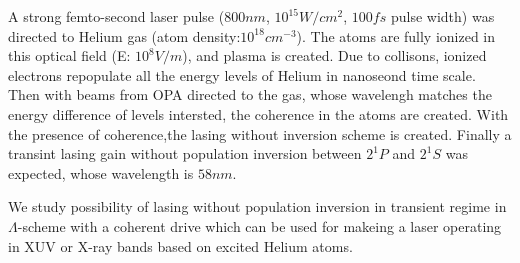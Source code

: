 A strong femto-second laser pulse ($800nm$, $10^{15} W/cm^2$, $100fs$ pulse width) was directed to Helium gas (atom density:$10^{18}cm^{-3}$). The atoms are fully ionized in this optical field (E: $10^8 V/m$), and plasma is created. Due to collisons, ionized electrons repopulate all the energy levels of Helium in nanoseond time scale. Then with beams from OPA directed to the gas, whose wavelengh matches the energy difference of levels intersted, the coherence in the atoms are created. With the presence of coherence,the lasing without inversion scheme is created. Finally a transint lasing gain without population inversion between $2^1P$ and $2^1S$ was expected, whose wavelength is $58nm$.

We study possibility of lasing without population inversion in
transient regime in $\Lambda$-scheme with a coherent drive which can
be used for makeing a laser operating in XUV or X-ray bands based on
excited Helium atoms.
